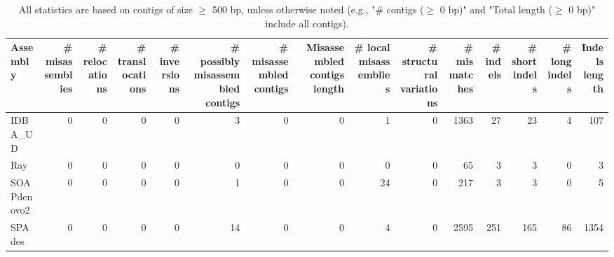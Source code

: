 \documentclass[12pt,a4paper]{article}
\begin{document}
\begin{table}[ht]
\begin{center}
\caption{All statistics are based on contigs of size $\geq$ 500 bp, unless otherwise noted (e.g., "\# contigs ($\geq$ 0 bp)" and "Total length ($\geq$ 0 bp)" include all contigs).}
\begin{tabular}{|l*{14}{|r}|}
\hline
Assembly & \# misassemblies &     \# relocations &     \# translocations &     \# inversions & \# possibly misassembled contigs & \# misassembled contigs & Misassembled contigs length & \# local misassemblies & \# structural variations & \# mismatches & \# indels &     \# short indels &     \# long indels & Indels length \\ \hline
IDBA\_UD & 0 & 0 & 0 & 0 & 3 & 0 & 0 & 1 & 0 & 1363 & 27 & 23 & 4 & 107 \\ \hline
Ray & 0 & 0 & 0 & 0 & 0 & 0 & 0 & 0 & 0 & 65 & 3 & 3 & 0 & 3 \\ \hline
SOAPdenovo2 & 0 & 0 & 0 & 0 & 1 & 0 & 0 & 24 & 0 & 217 & 3 & 3 & 0 & 5 \\ \hline
SPAdes & 0 & 0 & 0 & 0 & 14 & 0 & 0 & 4 & 0 & 2595 & 251 & 165 & 86 & 1354 \\ \hline
\end{tabular}
\end{center}
\end{table}
\end{document}
